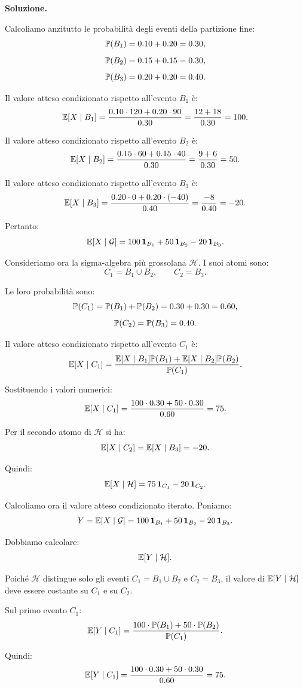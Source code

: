 \noindent
\textbf{Soluzione.}

Calcoliamo anzitutto le probabilit\`{a} degli eventi della partizione fine:
\[
\mathbb{P}(B_1)
=
0.10+0.20
=
0.30,
\]
\[
\mathbb{P}(B_2)
=
0.15+0.15
=
0.30,
\]
\[
\mathbb{P}(B_3)
=
0.20+0.20
=
0.40.
\]

Il valore atteso condizionato rispetto all'evento $B_1$ \`{e}:
\[
\mathbb{E}[X\mid B_1]
=
\frac{0.10\cdot120+0.20\cdot90}{0.30}
=
\frac{12+18}{0.30}
=
100.
\]

Il valore atteso condizionato rispetto all'evento $B_2$ \`{e}:
\[
\mathbb{E}[X\mid B_2]
=
\frac{0.15\cdot60+0.15\cdot40}{0.30}
=
\frac{9+6}{0.30}
=
50.
\]

Il valore atteso condizionato rispetto all'evento $B_3$ \`{e}:
\[
\mathbb{E}[X\mid B_3]
=
\frac{0.20\cdot0+0.20\cdot(-40)}{0.40}
=
\frac{-8}{0.40}
=
-20.
\]

Pertanto:
\[
\mathbb{E}[X\mid\mathcal{G}]
=
100\,\mathbf{1}_{B_1}
+
50\,\mathbf{1}_{B_2}
-
20\,\mathbf{1}_{B_3}.
\]

Consideriamo ora la sigma-algebra pi\`{u} grossolana $\mathcal{H}$. I suoi
atomi sono:
\[
C_1=B_1\cup B_2,
\qquad
C_2=B_3.
\]

Le loro probabilit\`{a} sono:
\[
\mathbb{P}(C_1)
=
\mathbb{P}(B_1)+\mathbb{P}(B_2)
=
0.30+0.30
=
0.60,
\]
\[
\mathbb{P}(C_2)
=
\mathbb{P}(B_3)
=
0.40.
\]

Il valore atteso condizionato rispetto all'evento $C_1$ \`{e}:
\[
\mathbb{E}[X\mid C_1]
=
\frac{
\mathbb{E}[X\mid B_1]\mathbb{P}(B_1)
+
\mathbb{E}[X\mid B_2]\mathbb{P}(B_2)
}
{
\mathbb{P}(C_1)
}.
\]

Sostituendo i valori numerici:
\[
\mathbb{E}[X\mid C_1]
=
\frac{
100\cdot0.30
+
50\cdot0.30
}
{0.60}
=
75.
\]

Per il secondo atomo di $\mathcal{H}$ si ha:
\[
\mathbb{E}[X\mid C_2]
=
\mathbb{E}[X\mid B_3]
=
-20.
\]

Quindi:
\[
\mathbb{E}[X\mid\mathcal{H}]
=
75\,\mathbf{1}_{C_1}
-
20\,\mathbf{1}_{C_2}.
\]

Calcoliamo ora il valore atteso condizionato iterato. Poniamo:
\[
Y
=
\mathbb{E}[X\mid\mathcal{G}]
=
100\,\mathbf{1}_{B_1}
+
50\,\mathbf{1}_{B_2}
-
20\,\mathbf{1}_{B_3}.
\]

Dobbiamo calcolare:
\[
\mathbb{E}[Y\mid\mathcal{H}].
\]

Poich\'{e} $\mathcal{H}$ distingue solo gli eventi $C_1=B_1\cup B_2$ e
$C_2=B_3$, il valore di $\mathbb{E}[Y\mid\mathcal{H}]$ deve essere costante su
$C_1$ e su $C_2$.

Sul primo evento $C_1$:
\[
\mathbb{E}[Y\mid C_1]
=
\frac{
100\cdot\mathbb{P}(B_1)
+
50\cdot\mathbb{P}(B_2)
}
{\mathbb{P}(C_1)}.
\]

Quindi:
\[
\mathbb{E}[Y\mid C_1]
=
\frac{
100\cdot0.30
+
50\cdot0.30
}
{0.60}
=
75.
\]

